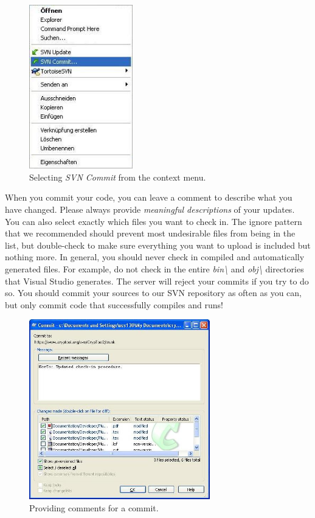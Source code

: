 \begin{figure}[h!]
	\centering
		\includegraphics[width=0.40\textwidth]{figures/tortoise_svn_commit.jpg}
	\caption{Selecting \textit{SVN Commit} from the context menu.}
	\label{fig:tortoise_svn_commit}
\end{figure}
\clearpage

When you commit your code, you can leave a comment to describe what you have changed. Please always provide \textit{meaningful descriptions} of your updates. You can also select exactly which files you want to check in. The ignore pattern that we recommended should prevent most undesirable files from being in the list, but double-check to make sure everything you want to upload is included but nothing more. In general, you should never check in compiled and automatically generated files. For example, do not check in the entire \textit{bin\textbackslash } and \textit{obj\textbackslash } directories that Visual Studio generates. The server will reject your commits if you try to do so. You should commit your sources to our SVN repository as often as you can, but only commit code that successfully compiles and runs!

\begin{figure}[h!]
	\centering
		\includegraphics[width=0.70\textwidth]{figures/tortoise_svn_commit2.jpg}
	\caption{Providing comments for a commit.}
	\label{fig:tortoise_svn_commit2}
\end{figure}

